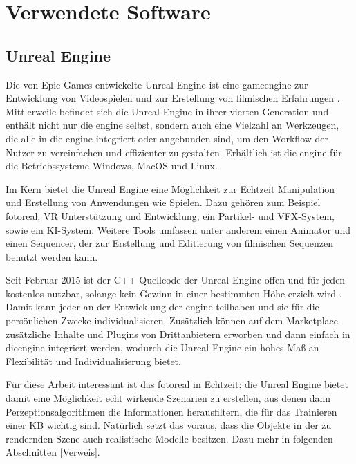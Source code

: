 \graphicspath{{./images/}}      
\def\CHAPTERONE{./chapters/Chapter-1} 

\chapter{Verwendete Software}
\label{chap:software}
%	

\section{Unreal Engine}
\label{chap:unrealengine}
Die von Epic Games entwickelte Unreal Engine ist eine \gls{gameengine} zur Entwicklung von Videospielen und zur Erstellung von filmischen Erfahrungen \cite{featUnreal}. Mittlerweile befindet sich die Unreal Engine in ihrer vierten Generation und enthält nicht nur die \acrshort{engine} selbst, sondern auch eine Vielzahl an Werkzeugen, die alle in die \acrshort{engine} integriert oder angebunden sind, um den Workflow der Nutzer zu vereinfachen und effizienter zu gestalten. Erhältlich ist die \acrshort{engine} für die Betriebssysteme Windows, MacOS und Linux. \par

Im Kern bietet die Unreal Engine eine Möglichkeit zur Echtzeit Manipulation und Erstellung von Anwendungen wie Spielen. Dazu gehören zum Beispiel \gls{fotoreal}, VR Unterstützung und Entwicklung, ein Partikel- und VFX-System, sowie ein KI-System. Weitere Tools umfassen unter anderem einen Animator und einen Sequencer, der zur Erstellung und Editierung von filmischen Sequenzen benutzt werden kann. \par 

Seit Februar 2015 ist der C++ Quellcode der Unreal Engine offen und für jeden kostenlos nutzbar, solange kein Gewinn in einer bestimmten Höhe erzielt wird \cite{freeUnreal}. Damit kann jeder an der Entwicklung der \acrshort{engine} teilhaben und sie für die persönlichen Zwecke individualisieren. Zusätzlich können auf dem Marketplace zusätzliche Inhalte und Plugins von Drittanbietern erworben und dann einfach in die\acrshort{engine} integriert werden, wodurch die Unreal Engine ein hohes Maß an Flexibilität und Individualisierung bietet. \par 

Für diese Arbeit interessant ist das \gls{fotoreal} in Echtzeit: die Unreal Engine bietet damit eine Möglichkeit echt wirkende Szenarien zu erstellen, aus denen dann Perzeptionsalgorithmen die Informationen herausfiltern, die für das Trainieren einer KB wichtig sind. Natürlich setzt das voraus, dass die Objekte in der zu rendernden Szene auch realistische Modelle besitzen. Dazu mehr in folgenden Abschnitten [Verweis].       

